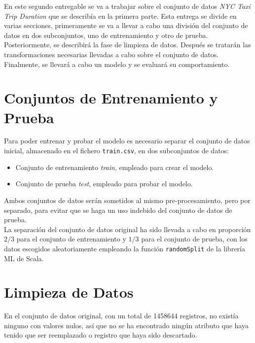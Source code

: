 \documentclass[12pt]{article}
\begin{document}
En este segundo entregable se va a trabajar sobre el conjunto de datos \textit{NYC Taxi Trip Duration} \cite{kaggle} que se describía en la primera parte. Esta entrega se divide en varias secciones, primeramente se va a llevar a cabo una división del conjunto de datos en dos subconjuntos, uno de entrenamiento y otro de prueba. Posteriormente, se describirá la fase de limpieza de datos. Después se tratarán las transformaciones necesarias llevadas a cabo sobre el conjunto de datos. Finalmente, se llevará a cabo un modelo y se evaluará su comportamiento.\\

\section{Conjuntos de Entrenamiento y Prueba}\label{cap2}
Para poder entrenar y probar el modelo es necesario separar el conjunto de datos inicial, almacenado en el fichero \texttt{train.csv}, en dos subconjuntos de datos:

\begin{itemize}
    \item Conjunto de entrenamiento \textit{train}, empleado para crear el modelo.
    \item Conjunto de prueba \textit{test}, empleado para probar el modelo.
\end{itemize}

Ambos conjuntos de datos serán sometidos al mismo pre-procesamiento, pero por separado, para evitar que se haga un uso indebido del conjunto de datos de prueba.\\

La separación del conjunto de datos original ha sido llevada a cabo en proporción $2/3$ para el conjunto de entrenamiento y $1/3$ para el conjunto de prueba, con los datos escogidos aleatoriamente empleando la función \texttt{randomSplit} de la librería ML de Scala.\\

\newpage

\section{Limpieza de Datos}\label{cap3}
En el conjunto de datos original, con un total de 1458644 registros, no existía ninguno con valores nulos, así que no se ha encontrado ningún atributo que haya tenido que ser reemplazado o registro que haya sido descartado.\\
\end{document}
